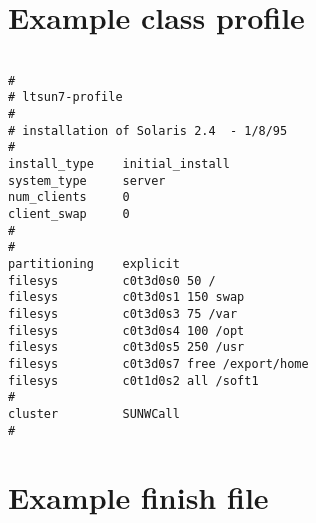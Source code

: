 \documentclass[11pt]{article}
\begin{document}
\newpage


\section{Example class profile}
\label{app:profile}

\begin{small}
\begin{verbatim}

#
# ltsun7-profile
#
# installation of Solaris 2.4  - 1/8/95
#
install_type    initial_install
system_type     server
num_clients     0
client_swap     0
#
#
partitioning    explicit
filesys         c0t3d0s0 50 /
filesys         c0t3d0s1 150 swap
filesys         c0t3d0s3 75 /var
filesys         c0t3d0s4 100 /opt
filesys         c0t3d0s5 250 /usr
filesys         c0t3d0s7 free /export/home
filesys         c0t1d0s2 all /soft1
#
cluster         SUNWCall
#

\end{verbatim}
\end{small}

\newpage

\section{Example finish file}
\label{app:finish}
\end{document}
